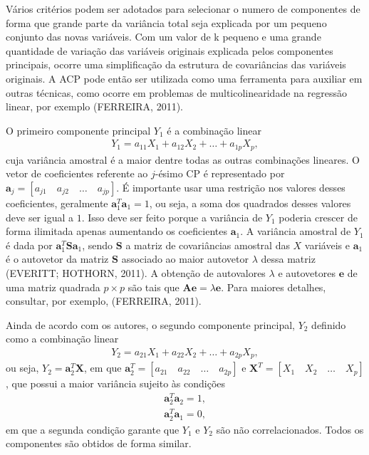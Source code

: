 \documentclass[12pt, a4paper,brazil,oneside]{article}
\begin{document}
	Vários critérios podem ser adotados para selecionar o numero de componentes de forma que grande parte da variância total seja explicada por um pequeno conjunto das novas variáveis. Com um valor de k pequeno e uma grande quantidade de variação das variáveis originais explicada pelos componentes principais, ocorre uma simplificação da estrutura de covariâncias das variáveis originais. A ACP pode então ser utilizada como uma ferramenta para auxiliar em outras técnicas, como ocorre em problemas de multicolinearidade na regressão linear, por exemplo (FERREIRA, 2011).
	
	O primeiro componente principal $Y_1$ é a combinação linear
	\begin{align*}
	Y_1 = a_{11}X_1 + a_{12}X_2 + \dots + a_{1p}X_p,
	\end{align*}
	cuja variância amostral é a maior dentre todas as outras combinações lineares. O vetor de coeficientes referente ao $j$-ésimo CP é representado por $\boldsymbol{a}_j= [a_{j1} \quad a_{j2} \quad \dots \quad a_{jp}]$. É importante usar uma restrição nos valores desses coeficientes, geralmente $\boldsymbol{a}_1^T\boldsymbol{a}_1 = 1$, ou seja, a soma dos quadrados desses valores deve ser igual a $1$. Isso deve ser feito porque a variância de $Y_1$ poderia crescer de forma ilimitada apenas aumentando os coeficientes $\boldsymbol{a}_1$. A variância amostral de $Y_1$ é dada por $\boldsymbol{a}_1^T\boldsymbol{S}\boldsymbol{a}_1$, sendo $\boldsymbol{S}$ a matriz de covariâncias amostral das $X$ variáveis e $\boldsymbol{a}_1$ é o autovetor da matriz $\boldsymbol{S}$ associado ao maior autovetor $\lambda$ dessa matriz (EVERITT; HOTHORN, 2011). A obtenção de autovalores $\lambda$ e autovetores $\boldsymbol{e}$ de uma matriz quadrada $p \times p$ são tais que $\boldsymbol{A}\boldsymbol{e} = \lambda\boldsymbol{e}$. Para maiores detalhes, consultar, por exemplo, (FERREIRA, 2011).
	
	Ainda de acordo com os autores, o segundo componente principal, $Y_2$ definido como a combinação linear
	\begin{align*}
	Y_2 = a_{21}X_1 + a_{22}X_2 + \dots + a_{2p}X_p,
	\end{align*}
	ou seja, $Y_2 = \boldsymbol{a}_2^T\boldsymbol{X}$, em que $\boldsymbol{a}_2^T = [a_{21} \quad a_{22} \quad \dots \quad a_{2p}]$ e $\boldsymbol{X}^T = [X_{1} \quad X_{2} \quad \dots \quad X_{p}]$, que possui a maior variância sujeito às condições
	\begin{align*}
	\boldsymbol{a}_2^T\boldsymbol{a}_2 = 1,\\
	\boldsymbol{a}_2^T\boldsymbol{a}_1 = 0,
	\end{align*}
	em que a segunda condição garante que $Y_1$ e $Y_2$ são não correlacionados. Todos os componentes são obtidos de forma similar.
	
\end{document}
